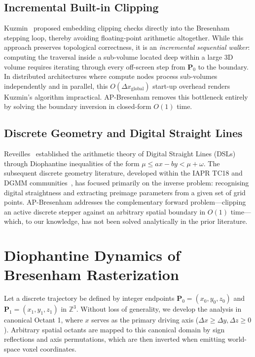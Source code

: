 \documentclass[conference]{IEEEtran}
\begin{document}
\subsection{Incremental Built-in Clipping}
Kuzmin~\cite{kuzmin1995bresenham} proposed embedding clipping checks directly into the Bresenham stepping loop, thereby avoiding floating-point arithmetic altogether. While this approach preserves topological correctness, it is an \emph{incremental sequential walker}: computing the traversal inside a sub-volume located deep within a large 3D volume requires iterating through every off-screen step from $\mathbf{P}_0$ to the boundary. In distributed architectures where compute nodes process sub-volumes independently and in parallel, this $O(\Delta x_{\mathrm{global}})$ start-up overhead renders Kuzmin's algorithm impractical. AP-Bresenham removes this bottleneck entirely by solving the boundary inversion in closed-form $O(1)$ time.

\subsection{Discrete Geometry and Digital Straight Lines}
Reveilles~\cite{reveilles1991geometrie} established the arithmetic theory of Digital Straight Lines (DSLs) through Diophantine inequalities of the form $\mu \le ax - by < \mu + \omega$. The subsequent discrete geometry literature, developed within the IAPR TC18 and DGMM communities~\cite{coeurjolly2004discrete,decelle2021digital,dgmm2022proceedings,dgmm2024proceedings,coeurjolly2025discrete}, has focused primarily on the inverse problem: recognising digital straightness and extracting preimage parameters from a given set of grid points. AP-Bresenham addresses the complementary forward problem---clipping an active discrete stepper against an arbitrary spatial boundary in $O(1)$ time---which, to our knowledge, has not been solved analytically in the prior literature.

\section{Diophantine Dynamics of Bresenham Rasterization}
\label{sec:math}

Let a discrete trajectory be defined by integer endpoints $\mathbf{P}_0 = (x_0, y_0, z_0)$ and $\mathbf{P}_1 = (x_1, y_1, z_1)$ in $\mathbb{Z}^3$. Without loss of generality, we develop the analysis in canonical Octant 1, where $x$ serves as the primary driving axis ($\Delta x \ge \Delta y, \Delta z \ge 0$). Arbitrary spatial octants are mapped to this canonical domain by sign reflections and axis permutations, which are then inverted when emitting world-space voxel coordinates.
\end{document}
